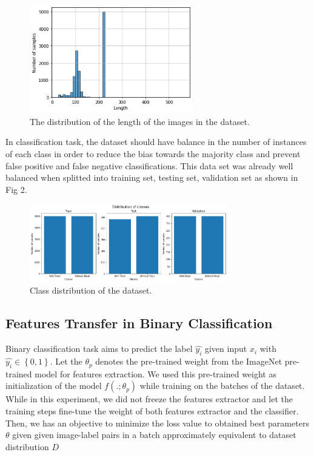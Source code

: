 \documentclass[conference]{IEEEtran}
\begin{document}
\begin{figure}[ht!] %
\centering
\includegraphics[width=2.8in]{size.png}
\caption{ The distribution of the length of the images in the dataset.}
\label{bench}
\end{figure}

In classification task, the dataset should have balance in the number of instances of each class in order to reduce the bias towards the majority class and prevent false positive and false negative classifications. This data set was already well balanced when splitted into training set, testing set, validation set as shown in Fig 2.

\begin{figure}[ht!] %
\centering
\includegraphics[width=3.4in]{distribution.png}
\caption{ Class distribution of the dataset.}
\label{bench}
\end{figure}

\subsection{Features Transfer in Binary Classification}
Binary classification task aims to predict the label $\hat{y_{i}}$ given input $x_{i}$ with $\hat{y_{i}} \in \left \{ 0,1 \right \}$. Let the $\theta_{p}$ denotes the pre-trained weight from the ImageNet pre-trained model for features extraction. We used this pre-trained weight as initialization of the model $f(.;\theta_{p})$ while training on the batches of the dataset. While in this experiment, we did not freeze the features extractor and let the training steps fine-tune the weight of both features extractor and the classifier. Then, we has an objective to minimize the loss value to obtained best parameters $\theta$ given given image-label pairs in a batch approximately equivalent to dataset distribution $D$  
\end{document}
